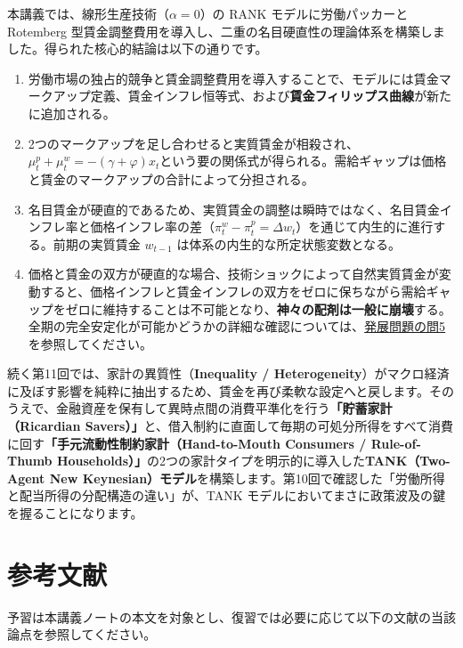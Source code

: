 \documentclass[
  japanese,
  lualatex,
  ja=standard,
  12pt,
  a4paper]{ltjsarticle}
\providecommand{\tightlist}{%
  \setlength{\itemsep}{0pt}\setlength{\parskip}{0pt}}
\begin{document}
本講義では、線形生産技術（\(\alpha=0\)）の RANK モデルに労働パッカーと
Rotemberg
型賃金調整費用を導入し、二重の名目硬直性の理論体系を構築しました。得られた核心的結論は以下の通りです。

\begin{enumerate}
\def\labelenumi{\arabic{enumi}.}
\tightlist
\item
  労働市場の独占的競争と賃金調整費用を導入することで、モデルには賃金マークアップ定義、賃金インフレ恒等式、および\textbf{賃金フィリップス曲線}が新たに追加される。
\item
  2つのマークアップを足し合わせると実質賃金が相殺され、\textbf{\(\mu_t^p + \mu_t^w = -(\gamma+\varphi)x_t\)}という要の関係式が得られる。需給ギャップは価格と賃金のマークアップの合計によって分担される。
\item
  名目賃金が硬直的であるため、実質賃金の調整は瞬時ではなく、名目賃金インフレ率と価格インフレ率の差（\(\pi_t^w - \pi_t^p = \Delta w_t\)）を通じて内生的に進行する。前期の実質賃金
  \(w_{t-1}\) は体系の内生的な所定状態変数となる。
\item
  価格と賃金の双方が硬直的な場合、技術ショックによって自然実質賃金が変動すると、価格インフレと賃金インフレの双方をゼロに保ちながら需給ギャップをゼロに維持することは不可能となり、\textbf{神々の配剤は一般に崩壊}する。全期の完全安定化が可能かどうかの詳細な確認については、\hyperref[sec-lecture10-extensions]{発展問題の問5}を参照してください。
\end{enumerate}

続く第11回では、家計の異質性（\textbf{Inequality /
Heterogeneity}）がマクロ経済に及ぼす影響を純粋に抽出するため、賃金を再び柔軟な設定へと戻します。そのうえで、金融資産を保有して異時点間の消費平準化を行う\textbf{「貯蓄家計（Ricardian
Savers）」}と、借入制約に直面して毎期の可処分所得をすべて消費に回す\textbf{「手元流動性制約家計（Hand-to-Mouth
Consumers / Rule-of-Thumb
Households）」}の2つの家計タイプを明示的に導入した\textbf{TANK（Two-Agent
New
Keynesian）モデル}を構築します。第10回で確認した「労働所得と配当所得の分配構造の違い」が、TANK
モデルにおいてまさに政策波及の鍵を握ることになります。

\Needspace{0.35\textheight}

\section{参考文献}\label{ux53c2ux8003ux6587ux732e}

予習は本講義ノートの本文を対象とし、復習では必要に応じて以下の文献の当該論点を参照してください。
\end{document}
